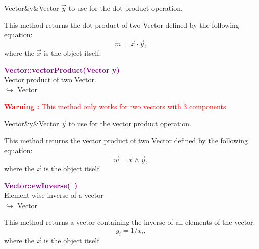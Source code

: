 \begin{tcolorbox}[width=\textwidth,myArgs,tabularx={ll|R}]
Vector&y&Vector $\overrightarrow{y}$ to use for the dot product operation.
\end{tcolorbox}

This method returns the dot product of two Vector defined by the following equation:
\begin{equation*}
m = \overrightarrow{x}\cdot\overrightarrow{y},
\end{equation*}
where the $\overrightarrow{x}$ is the object itself.

\textcolor{purple}{\textbf{Vector::vectorProduct(Vector y)}}\label{Vector::vectorProduct(Vector y)}\\
Vector product of two Vector.\\ \hspace*{10mm}$\hookrightarrow$ Vector

\hspace*{10mm}\textcolor{red}{\textbf{Warning :} This method only works for two vectors with 3 components.}

\begin{tcolorbox}[width=\textwidth,myArgs,tabularx={ll|R}]
Vector&y&Vector $\overrightarrow{y}$ to use for the vector product operation.
\end{tcolorbox}

This method returns the vector product of two Vector defined by the following equation:
\begin{equation*}
\overrightarrow{w} = \overrightarrow{x}\land\overrightarrow{y},
\end{equation*}
where the $\overrightarrow{x}$ is the object itself.

\textcolor{purple}{\textbf{Vector::ewInverse(~)}}\label{Vector::ewInverse()}\\
Element-wise inverse of a vector\\ \hspace*{10mm}$\hookrightarrow$ Vector

This method returns a vector containing the inverse of all elements of the vector.
\begin{equation*}
y_i = 1/x_i,
\end{equation*}
where the $\overrightarrow{x}$ is the object itself.

